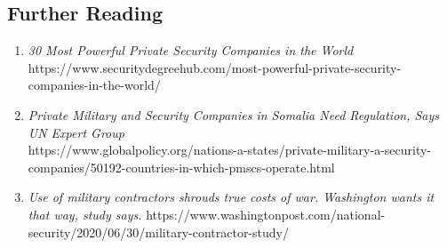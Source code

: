 \documentclass[10pt, letterpaper]{article}
\begin{document}
\subsection{Further Reading}

\begin{enumerate}
\def\labelenumi{\arabic{enumi}.}
\item
  \emph{30 Most Powerful Private Security Companies in the World}
  https://www.securitydegreehub.com/most-powerful-private-security-companies-in-the-world/
\item
  \emph{Private Military and Security Companies in Somalia Need
  Regulation, Says UN Expert Group}\\
  https://www.globalpolicy.org/nations-a-states/private-military-a-security-companies/50192-countries-in-which-pmscs-operate.html
\item
  \emph{Use of military contractors shrouds true costs of war.
  Washington wants it that way, study says.} https://www.washingtonpost.com/national-security/2020/06/30/military-contractor-study/
\end{enumerate}
\end{document}
